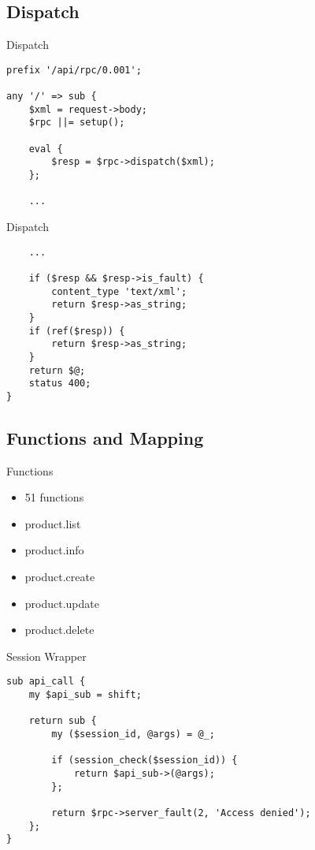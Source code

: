 \subsection{Dispatch}
\begin{frame}[fragile]{Dispatch}
\begin{lstlisting}
prefix '/api/rpc/0.001';

any '/' => sub {
    $xml = request->body;
    $rpc ||= setup();

    eval {
        $resp = $rpc->dispatch($xml);
    };
    
    ...

\end{lstlisting}
\end{frame}

\begin{frame}[fragile]{Dispatch}
\begin{lstlisting}
    ...
    
    if ($resp && $resp->is_fault) {
        content_type 'text/xml';
        return $resp->as_string;
    }
    if (ref($resp)) {
        return $resp->as_string;
    }
    return $@;    
    status 400;
}
\end{lstlisting}
\end{frame}

\subsection{Functions and Mapping}

\begin{frame}{Functions}
\begin{itemize}
\item 51 functions
\item product.list
\item product.info
\item product.create
\item product.update
\item product.delete
\end{itemize}
\end{frame}

\begin{frame}[fragile]{Session Wrapper}
\begin{lstlisting}
sub api_call {
    my $api_sub = shift;

    return sub {
        my ($session_id, @args) = @_;

        if (session_check($session_id)) {
            return $api_sub->(@args);
        };

        return $rpc->server_fault(2, 'Access denied');
    };
}
\end{lstlisting}
\end{frame}

